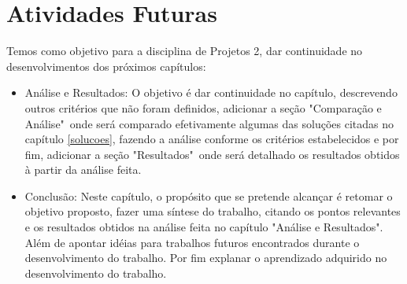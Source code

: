 \chapter{Atividades Futuras}
Temos como objetivo para a disciplina de Projetos 2, dar continuidade no desenvolvimentos dos próximos capítulos:

\begin{itemize}
    \item Análise e Resultados: O objetivo é dar continuidade no capítulo, descrevendo outros critérios que não foram definidos, adicionar a seção "Comparação e Análise"\ onde será comparado efetivamente algumas das soluções citadas no capítulo \ref{solucoes}, fazendo a análise conforme os critérios estabelecidos e por fim, adicionar a seção "Resultados"\ onde será detalhado os resultados obtidos à partir da análise feita.
    \item Conclusão: Neste capítulo, o propósito que se pretende alcançar é retomar o objetivo proposto, fazer uma síntese do trabalho, citando os pontos relevantes e os resultados obtidos na análise feita no capítulo "Análise e Resultados". Além de apontar idéias para trabalhos futuros encontrados durante o desenvolvimento do trabalho. Por fim explanar o aprendizado adquirido no desenvolvimento do trabalho.
\end{itemize}
